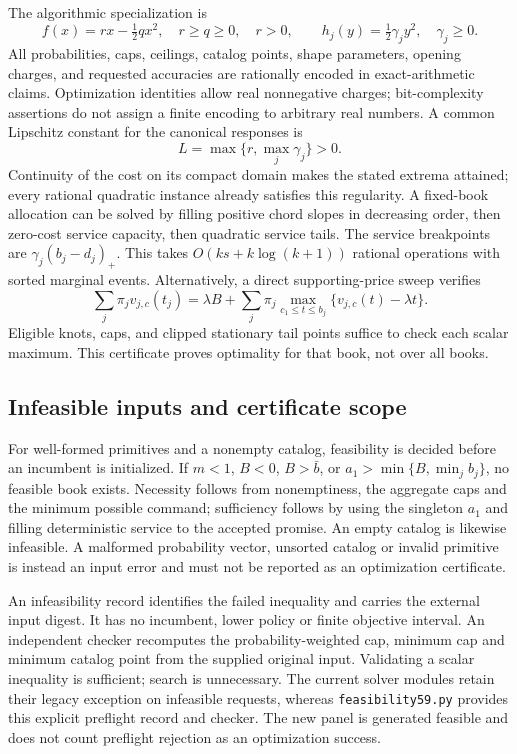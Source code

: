 \documentclass[11pt,letterpaper]{article}
\theoremstyle{definition}\newtheorem{remark}[theorem]{Remark}
\begin{document}
The algorithmic specialization is
\begin{equation}\label{eq:quadratic52}
 f(x)=rx-\tfrac12 qx^2,\quad r\geq q\geq0,\quad r>0,\qquad h_j(y)=\tfrac12\gamma_jy^2,\quad \gamma_j\geq0.
\end{equation}
All probabilities, caps, ceilings, catalog points, shape parameters, opening charges, and requested accuracies are rationally encoded in exact-arithmetic claims. Optimization identities allow real nonnegative charges; bit-complexity assertions do not assign a finite encoding to arbitrary real numbers. A common Lipschitz constant for the canonical responses is
\begin{equation}\label{eq:L52}L=\max\{r,\max_j\gamma_j\}>0.\end{equation}
Continuity of the cost on its compact domain makes the stated extrema attained; every rational quadratic instance already satisfies this regularity. A fixed-book allocation can be solved by filling positive chord slopes in decreasing order, then zero-cost service capacity, then quadratic service tails. The service breakpoints are $\gamma_j(b_j-d_j)_+$. This takes $O(ks+k\log(k+1))$ rational operations with sorted marginal events. Alternatively, a direct supporting-price sweep verifies
\begin{equation}\label{eq:fixeddual52}
 \sum_j\pi_jv_{j,c}(t_j)=\lambda B+\sum_j\pi_j\max_{c_1\leq t\leq b_j}\{v_{j,c}(t)-\lambda t\}.
\end{equation}
Eligible knots, caps, and clipped stationary tail points suffice to check each scalar maximum. This certificate proves optimality for that book, not over all books.
\subsection{Infeasible inputs and certificate scope}\label{sec:infeasible59}
For well-formed primitives and a nonempty catalog, feasibility is decided before an incumbent is initialized. If $m<1$, $B<0$, $B>\bar b$, or $a_1>\min\{B,\min_jb_j\}$, no feasible book exists. Necessity follows from nonemptiness, the aggregate caps and the minimum possible command; sufficiency follows by using the singleton $a_1$ and filling deterministic service to the accepted promise. An empty catalog is likewise infeasible. A malformed probability vector, unsorted catalog or invalid primitive is instead an input error and must not be reported as an optimization certificate.

An infeasibility record identifies the failed inequality and carries the external input digest. It has no incumbent, lower policy or finite objective interval. An independent checker recomputes the probability-weighted cap, minimum cap and minimum catalog point from the supplied original input. Validating a scalar inequality is sufficient; search is unnecessary. The current solver modules retain their legacy exception on infeasible requests, whereas \texttt{feasibility59.py} provides this explicit preflight record and checker. The new panel is generated feasible and does not count preflight rejection as an optimization success.
\end{document}
